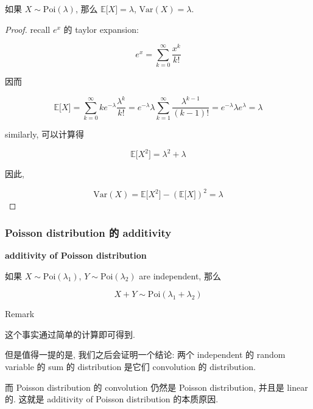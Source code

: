 \documentclass{qlnotes-export}
\begin{document}
\begin{proposition}

如果 \(X \sim \text{Poi}(\lambda)\), 那么 \({\mathbb{E}}\lbrack X\rbrack = \lambda\), \(\text{Var}(X) = \lambda\).

\end{proposition}

\begin{proof}

recall \(e^{x}\) 的 taylor expansion:

\[e^{x} = \sum\limits_{k = 0}^{\infty}\frac{x^{k}}{k!}\]

因而

\[{\mathbb{E}}\lbrack X\rbrack = \sum\limits_{k = 0}^{\infty}ke^{- \lambda}\frac{\lambda^{k}}{k!} = e^{- \lambda}\lambda\sum\limits_{k = 1}^{\infty}\frac{\lambda^{k - 1}}{(k - 1)!} = e^{- \lambda}\lambda e^{\lambda} = \lambda\]

similarly, 可以计算得

\[{\mathbb{E}}\lbrack X^{2}\rbrack = \lambda^{2} + \lambda\]

因此,

\[\text{Var}(X) = {\mathbb{E}}\lbrack X^{2}\rbrack - ({\mathbb{E}}\lbrack X\rbrack)^{2} = \lambda\]

\end{proof}

\subsubsection{Poisson distribution 的 additivity}\label{poisson-distribution-ux7684-additivity}

\begin{theorem}{\protect{}\label{kn-additivity-of-poisson-distribution}{\textbf{additivity
of Poisson distribution}}}

如果 \(X \sim \text{Poi}(\lambda_{1})\), \(Y \sim \text{Poi}(\lambda_{2})\) are independent, 那么

\[X + Y \sim \text{Poi}(\lambda_{1} + \lambda_{2})\]

\end{theorem}

\begin{qlremark}{Remark}

这个事实通过简单的计算即可得到.

但是值得一提的是, 我们之后会证明一个结论: 两个 independent 的 random variable 的 sum 的 distribution 是它们 convolution 的 distribution.

而 Poisson distribution 的 convolution 仍然是 Poisson distribution, 并且是 linear 的. 这就是 additivity of Poisson distribution 的本质原因.

\end{qlremark}
\end{document}
